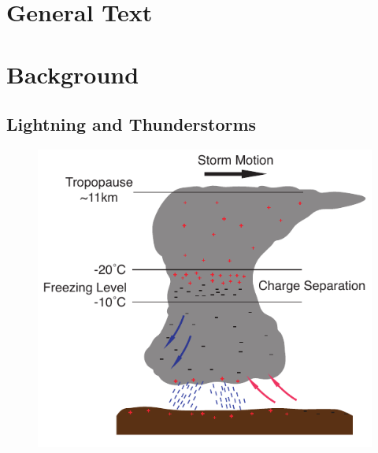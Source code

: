 \section{General Text}

\section{Background}

\subsection{Lightning and Thunderstorms}

\begin{figure}[ht!]
	\centering
	\includegraphics[scale=1]{Introduction/Figures/Thunderstorm_Structure.pdf}\\
	\caption{}
	\label{intro:fig:thunderstorm}
\end{figure}



